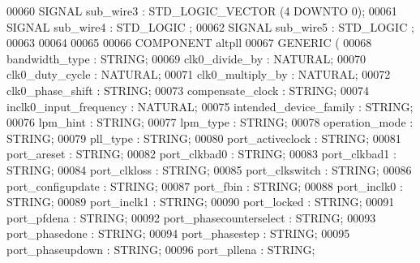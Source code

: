\begin{DoxyCode}
{00060     \textcolor{keywordflow}{SIGNAL} \textcolor{vhdlchar}{sub_wire3}    \textcolor{vhdlchar}{:} \textcolor{comment}{STD\_LOGIC\_VECTOR} \textcolor{vhdlchar}{(}\textcolor{vhdllogic}{}\textcolor{vhdllogic}{4} \textcolor{keywordflow}{DOWNTO} \textcolor{vhdllogic}{}\textcolor{vhdllogic}{0}\textcolor{vhdlchar}{)};
00061     \textcolor{keywordflow}{SIGNAL} \textcolor{vhdlchar}{sub_wire4}    \textcolor{vhdlchar}{:} \textcolor{comment}{STD\_LOGIC} ;
00062     \textcolor{keywordflow}{SIGNAL} \textcolor{vhdlchar}{sub_wire5}    \textcolor{vhdlchar}{:} \textcolor{comment}{STD\_LOGIC} ;
00063 
00064 
00065 
00066     \textcolor{keywordflow}{COMPONENT} altpll
00067     \textcolor{keywordflow}{GENERIC} (
00068         bandwidth\_type      : \textcolor{comment}{STRING};
00069         clk0\_divide\_by      : \textcolor{comment}{NATURAL};
00070         clk0\_duty\_cycle     : \textcolor{comment}{NATURAL};
00071         clk0\_multiply\_by        : \textcolor{comment}{NATURAL};
00072         clk0\_phase\_shift        : \textcolor{comment}{STRING};
00073         compensate\_clock        : \textcolor{comment}{STRING};
00074         inclk0\_input\_frequency      : \textcolor{comment}{NATURAL};
00075         intended\_device\_family      : \textcolor{comment}{STRING};
00076         lpm\_hint        : \textcolor{comment}{STRING};
00077         lpm\_type        : \textcolor{comment}{STRING};
00078         operation\_mode      : \textcolor{comment}{STRING};
00079         pll\_type        : \textcolor{comment}{STRING};
00080         port\_activeclock        : \textcolor{comment}{STRING};
00081         port\_areset     : \textcolor{comment}{STRING};
00082         port\_clkbad0        : \textcolor{comment}{STRING};
00083         port\_clkbad1        : \textcolor{comment}{STRING};
00084         port\_clkloss        : \textcolor{comment}{STRING};
00085         port\_clkswitch      : \textcolor{comment}{STRING};
00086         port\_configupdate       : \textcolor{comment}{STRING};
00087         port\_fbin       : \textcolor{comment}{STRING};
00088         port\_inclk0     : \textcolor{comment}{STRING};
00089         port\_inclk1     : \textcolor{comment}{STRING};
00090         port\_locked     : \textcolor{comment}{STRING};
00091         port\_pfdena     : \textcolor{comment}{STRING};
00092         port\_phasecounterselect     : \textcolor{comment}{STRING};
00093         port\_phasedone      : \textcolor{comment}{STRING};
00094         port\_phasestep      : \textcolor{comment}{STRING};
00095         port\_phaseupdown        : \textcolor{comment}{STRING};
00096         port\_pllena     : \textcolor{comment}{STRING};
}
\end{DoxyCode}
